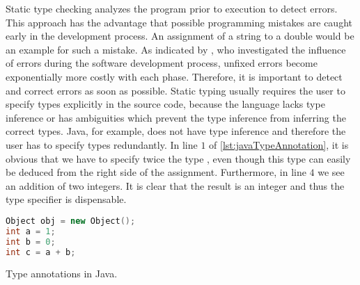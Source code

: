 Static type checking analyzes the program prior to execution to detect errors.
This approach has the advantage that possible programming mistakes are caught early in the development process.
An assignment of a string to a double would be an example for such a mistake.
As indicated by \cite{westland:jss2002a}, who investigated the influence of errors during the software development process, unfixed errors become exponentially more costly with each phase.
Therefore, it is important to detect and correct errors as soon as possible.
Static typing usually requires the user to specify types explicitly in the source code, because the language lacks type inference or has ambiguities which prevent the type inference from inferring the correct types.
Java, for example, does not have type inference and therefore the user has to specify types redundantly.
In line $1$ of \cref{lst:javaTypeAnnotation}, it is obvious that we have to specify twice the type , even though this type can easily be deduced from the right side of the assignment.
Furthermore, in line $4$ we see an addition of two integers.
It is clear that the result is an integer and thus the  type specifier is dispensable.
\begin{listing}[!h]
	\begin{CenteredBox}
		\begin{lstlisting}[language=C++,
		  commentstyle=\color{black},
		  stringstyle=\color{black},
		  keywordstyle=\color{black}\bfseries,
		  ]
Object obj = new Object();
int a = 1;
int b = 0;
int c = a + b;			
		\end{lstlisting}
	\end{CenteredBox}
	\caption{Type annotations in Java.}
	\label{lst:javaTypeAnnotation}
\end{listing}

